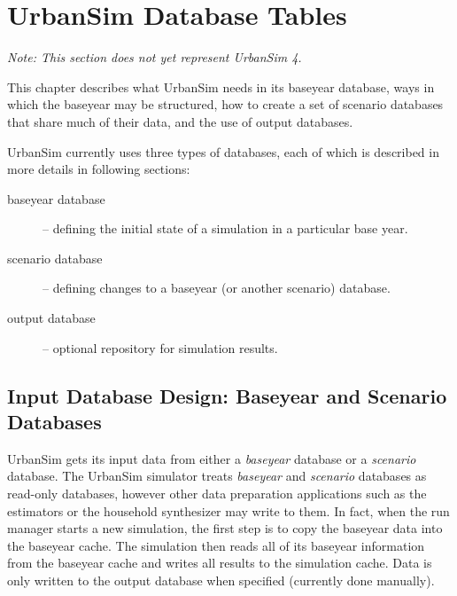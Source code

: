 
\chapter{UrbanSim Database Tables}
\label{chapter:urbansim-database-tables}

\emph{\Large Note: This section does not yet represent UrbanSim 4.}

This chapter describes what UrbanSim needs in its baseyear database, ways in
which the baseyear may be structured, how to create a set of scenario databases
that share much of their data, and the use of output databases.

UrbanSim currently uses three types of databases, each of which is described in
more details in following sections:

\begin{description}
\item[baseyear database] -- defining the initial state of a simulation in a
particular base year.
\item[scenario database] -- defining changes to a baseyear (or another scenario)
database.
\item[output database] -- optional repository for simulation results.
\end{description}

\section{Input Database Design: Baseyear and Scenario Databases}
\label{urbansim-database-tables-baseyear-scenario-db}

UrbanSim gets its input data from either a \emph{baseyear} database or a
\emph{scenario} database.  The UrbanSim simulator treats \emph{baseyear} and
\emph{scenario} databases as read-only databases, however other data
preparation applications such as the estimators or the household synthesizer
may write to them.  In fact, when the run manager starts a new simulation, the
first step is to copy the baseyear data into the baseyear cache. \baseyearcacheindex The
simulation then reads all of its baseyear information from the baseyear cache \baseyearcacheindex
and writes all results to the simulation cache. \simulationcacheindex Data is only written to the
output database when specified (currently done manually).

